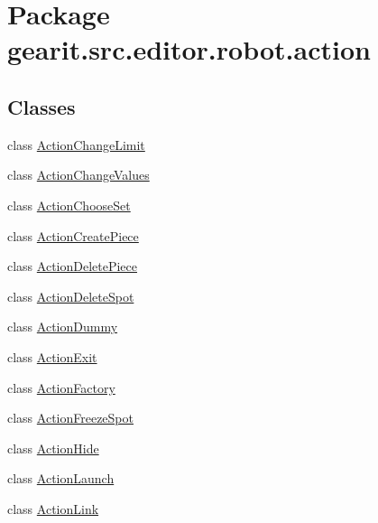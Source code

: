 \hypertarget{namespacegearit_1_1src_1_1editor_1_1robot_1_1action}{\section{Package gearit.\+src.\+editor.\+robot.\+action}
\label{namespacegearit_1_1src_1_1editor_1_1robot_1_1action}
}
\subsection*{Classes}
\begin{DoxyCompactItemize}
\item 
class \hyperlink{classgearit_1_1src_1_1editor_1_1robot_1_1action_1_1_action_change_limit}{Action\+Change\+Limit}
\item 
class \hyperlink{classgearit_1_1src_1_1editor_1_1robot_1_1action_1_1_action_change_values}{Action\+Change\+Values}
\item 
class \hyperlink{classgearit_1_1src_1_1editor_1_1robot_1_1action_1_1_action_choose_set}{Action\+Choose\+Set}
\item 
class \hyperlink{classgearit_1_1src_1_1editor_1_1robot_1_1action_1_1_action_create_piece}{Action\+Create\+Piece}
\item 
class \hyperlink{classgearit_1_1src_1_1editor_1_1robot_1_1action_1_1_action_delete_piece}{Action\+Delete\+Piece}
\item 
class \hyperlink{classgearit_1_1src_1_1editor_1_1robot_1_1action_1_1_action_delete_spot}{Action\+Delete\+Spot}
\item 
class \hyperlink{classgearit_1_1src_1_1editor_1_1robot_1_1action_1_1_action_dummy}{Action\+Dummy}
\item 
class \hyperlink{classgearit_1_1src_1_1editor_1_1robot_1_1action_1_1_action_exit}{Action\+Exit}
\item 
class \hyperlink{classgearit_1_1src_1_1editor_1_1robot_1_1action_1_1_action_factory}{Action\+Factory}
\item 
class \hyperlink{classgearit_1_1src_1_1editor_1_1robot_1_1action_1_1_action_freeze_spot}{Action\+Freeze\+Spot}
\item 
class \hyperlink{classgearit_1_1src_1_1editor_1_1robot_1_1action_1_1_action_hide}{Action\+Hide}
\item 
class \hyperlink{classgearit_1_1src_1_1editor_1_1robot_1_1action_1_1_action_launch}{Action\+Launch}
\item 
class \hyperlink{classgearit_1_1src_1_1editor_1_1robot_1_1action_1_1_action_link}{Action\+Link}

\end{DoxyCompactItemize}
